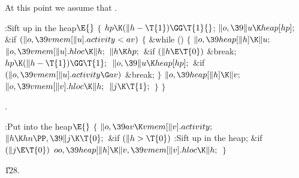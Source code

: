 At this point we assume that .

\Y\B\4:Sift  up in the heap\X${}\E{}$\6
${}\{{}$\1\6
${}\\{hp}\K(\|h-\T{1})\GG\T{1}{}$;\6
${}\|o,\39\|u\K\\{heap}[\\{hp}];{}$\6
\&{if} ${}(\|o,\39\\{vmem}[\|u].\\{activity}<\\{av}){}$\5
${}\{{}$\1\6
\&{while} ()\5
${}\{{}$\1\6
${}\|o,\39\\{heap}[\|h]\K\|u;{}$\6
${}\|o,\39\\{vmem}[\|u].\\{hloc}\K\|h;{}$\6
${}\|h\K\\{hp};{}$\6
\&{if} ${}(\|h\E\T{0}){}$\1\5
\&{break};\2\6
${}\\{hp}\K(\|h-\T{1})\GG\T{1};{}$\6
${}\|o,\39\|u\K\\{heap}[\\{hp}];{}$\6
\&{if} ${}(\|o,\39\\{vmem}[\|u].\\{activity}\G\\{av}){}$\1\5
\&{break};\2\6
\4${}\}{}$\2\6
${}\|o,\39\\{heap}[\|h]\K\|v;{}$\6
${}\|o,\39\\{vmem}[\|v].\\{hloc}\K\|h;{}$\6
${}\|j\K\T{1};{}$\6
\4${}\}{}$\2\6
\4${}\}{}$\2\par
{}.\fi

\B{}:Put  into the heap\X${}\E{}$\6
${}\{{}$\1\6
${}\|o,\39\\{av}\K\\{vmem}[\|v].\\{activity};{}$\6
${}\|h\K\\{hn}\PP,\39\|j\K\T{0};{}$\6
\&{if} ${}(\|h>\T{0}){}$\1\5
:Sift  up in the heap\X;\2\6
\&{if} ${}(\|j\E\T{0}){}$\1\5
${}\\{oo},\39\\{heap}[\|h]\K\|v,\39\\{vmem}[\|v].\\{hloc}\K\|h;{}$\2\6
\4${}\}{}$\2\par
\U128.\fi

